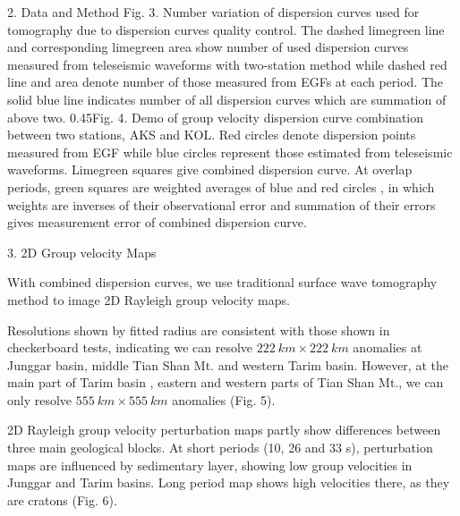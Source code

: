 \documentclass[
    landscape,      %
    paperwidth = 1120mm,
    paperheight = 820mm,
    fontscale = 0.45,
    margin = 1.7cm,
]{baposter}
\begin{document}
\begin{poster}
\begin{posterbox}[column=0, below=auto]{2. Data and Method}
{Fig. 3.}
{Number variation of dispersion curves used for tomography due to dispersion curves quality control. The dashed limegreen line and corresponding limegreen area show
number of used dispersion curves measured from teleseismic waveforms with two-station method while dashed red line and area denote number of those measured from EGFs at each period. The
solid blue line indicates number of all dispersion curves which are summation of above two.}
{0.45\textwidth}{Fig. 4.}
{Demo of group velocity dispersion curve combination between two stations, AKS and KOL.
Red circles denote dispersion points measured from EGF while blue circles represent those estimated from teleseismic waveforms.
Limegreen squares give combined dispersion curve. At overlap periods, green squares are weighted averages of blue and red circles
, in which weights are inverses of their observational error and summation of their errors gives measurement error of combined dispersion curve.
}



\end{posterbox}

\begin{posterbox}[column=1]{3. 2D Group velocity Maps}

With combined dispersion curves, we use traditional surface wave tomography method
to image 2D Rayleigh group velocity maps.

Resolutions shown by fitted radius are
consistent with those shown in checkerboard tests, indicating we can
resolve $222 \ \textit{km} \times 222 \ \textit{km}$ anomalies at Junggar basin,
middle Tian Shan Mt. and  western Tarim basin. However, at the main part of Tarim basin ,
eastern and western parts of Tian Shan Mt., we can only resolve $555 \ \textit{km} \times 555 \ \textit{km}$
anomalies (Fig. 5).

2D Rayleigh group velocity perturbation maps partly show differences between three main geological
blocks. At short periods (10, 26 and 33 s),  perturbation maps are influenced by sedimentary layer, showing
low group velocities in Junggar and Tarim basins. Long period map shows high velocities there, as they are cratons (Fig. 6).


\end{posterbox}
\end{poster}
\end{document}
